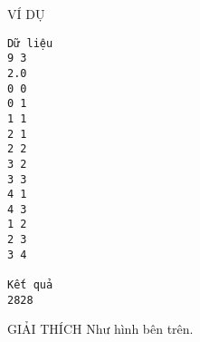 VÍ DỤ
\begin{verbatim}
Dữ liệu
9 3
2.0
0 0
0 1
1 1
2 1
2 2
3 2
3 3
4 1
4 3
1 2
2 3
3 4

Kết quả
2828
\end{verbatim}
GIẢI THÍCH
Như hình bên trên.